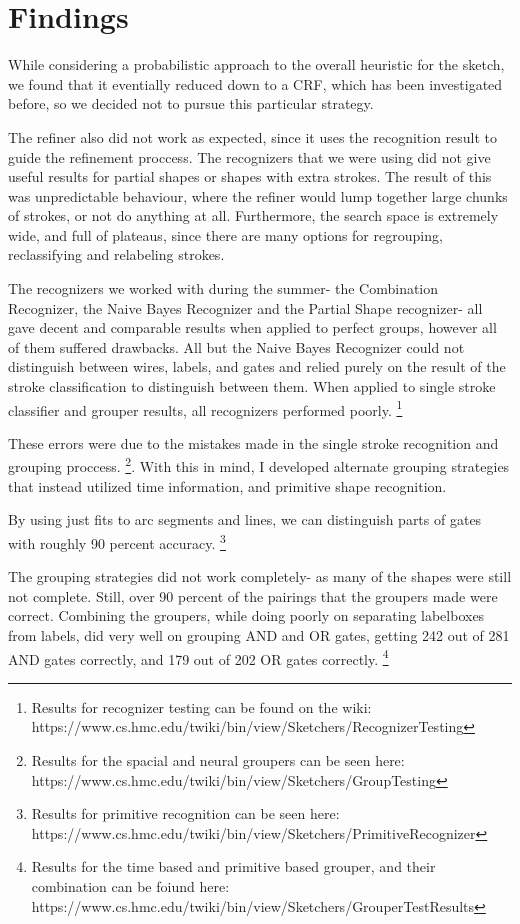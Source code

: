 \documentclass{article}
\begin{document}
\section{Findings}
While considering a probabilistic approach to the overall heuristic for the sketch, we found that it eventially reduced down to a CRF, which has been investigated before, so we decided not to pursue this particular strategy.

The refiner also did not work as expected, since it uses the recognition result to guide the refinement proccess. The recognizers that we were using did not give useful results for partial shapes or shapes with extra strokes. The result of this was unpredictable behaviour, where the refiner would lump together large chunks of strokes, or not do anything at all. Furthermore, the search space is extremely wide, and full of plateaus, since there are many options for regrouping, reclassifying and relabeling strokes.

The recognizers we worked with during the summer- the Combination Recognizer, the Naive Bayes Recognizer and the Partial Shape recognizer- all gave decent and comparable results when applied to perfect groups, however all of them suffered drawbacks. All but the Naive Bayes Recognizer could not distinguish between wires, labels, and gates and relied purely on the result of the stroke classification to distinguish between them. When applied to single stroke classifier and grouper results, all recognizers performed poorly. \footnote{Results for recognizer testing can be found on the wiki: https://www.cs.hmc.edu/twiki/bin/view/Sketchers/RecognizerTesting} 

These errors were due to the mistakes made in the single stroke recognition and grouping proccess. \footnote{Results for the spacial and neural groupers can be seen here: https://www.cs.hmc.edu/twiki/bin/view/Sketchers/GroupTesting}. With this in mind, I developed alternate grouping strategies that instead utilized time information, and primitive shape recognition.

By using just fits to arc segments and lines, we can distinguish parts of gates with roughly 90 percent accuracy. \footnote{Results for primitive recognition can be seen here: https://www.cs.hmc.edu/twiki/bin/view/Sketchers/PrimitiveRecognizer}

The grouping strategies did not work completely- as many of the shapes were still not complete. Still, over 90 percent of the pairings that the groupers made were correct. Combining the groupers, while doing poorly on separating labelboxes from labels, did very well on grouping AND and OR gates, getting 242 out of 281 AND gates correctly, and 179 out of 202 OR gates correctly. \footnote{
Results for the time based and primitive based grouper, and their combination can be foiund here: https://www.cs.hmc.edu/twiki/bin/view/Sketchers/GrouperTestResults}
\end{document}
